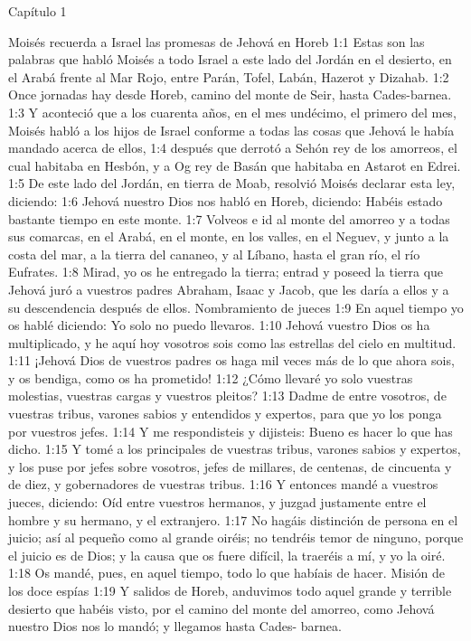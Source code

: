 Capítulo 1


Moisés recuerda a Israel las promesas de Jehová en Horeb  
1:1 Estas son las palabras que habló Moisés a todo Israel a este lado del Jordán en el desierto, en el Arabá frente al Mar Rojo, entre Parán, Tofel, Labán, Hazerot y Dizahab.  
1:2 Once jornadas hay desde Horeb, camino del monte de Seir, hasta Cades-barnea.  
1:3 Y aconteció que a los cuarenta años, en el mes undécimo, el primero del mes, Moisés habló a los hijos de Israel conforme a todas las cosas que Jehová le había mandado acerca de ellos,  
1:4 después que derrotó a Sehón rey de los amorreos, el cual habitaba en Hesbón, y a Og rey de Basán que habitaba en Astarot en Edrei.  
1:5 De este lado del Jordán, en tierra de Moab, resolvió Moisés declarar esta ley, diciendo:  
1:6 Jehová nuestro Dios nos habló en Horeb, diciendo: Habéis estado bastante tiempo en este monte.  
1:7 Volveos e id al monte del amorreo y a todas sus comarcas, en el Arabá, en el monte, en los valles, en el Neguev, y junto a la costa del mar, a la tierra del cananeo, y al Líbano, hasta el gran río, el río Eufrates.  
1:8 Mirad, yo os he entregado la tierra; entrad y poseed la tierra que Jehová juró a vuestros padres Abraham, Isaac y Jacob, que les daría a ellos y a su descendencia después de ellos.  
Nombramiento de jueces   
1:9 En aquel tiempo yo os hablé diciendo: Yo solo no puedo llevaros.  
1:10 Jehová vuestro Dios os ha multiplicado, y he aquí hoy vosotros sois como las estrellas del cielo en multitud.  
1:11 ¡Jehová Dios de vuestros padres os haga mil veces más de lo que ahora sois, y os bendiga, como os ha prometido!  
1:12 ¿Cómo llevaré yo solo vuestras molestias, vuestras cargas y vuestros pleitos?  
1:13 Dadme de entre vosotros, de vuestras tribus, varones sabios y entendidos y expertos, para que yo los ponga por vuestros jefes.  
1:14 Y me respondisteis y dijisteis: Bueno es hacer lo que has dicho.  
1:15 Y tomé a los principales de vuestras tribus, varones sabios y expertos, y los puse por jefes sobre vosotros, jefes de millares, de centenas, de cincuenta y de diez, y gobernadores de vuestras tribus.  
1:16 Y entonces mandé a vuestros jueces, diciendo: Oíd entre vuestros hermanos, y juzgad justamente entre el hombre y su hermano, y el extranjero.  
1:17 No hagáis distinción de persona en el juicio; así al pequeño como al grande oiréis; no tendréis temor de ninguno, porque el juicio es de Dios; y la causa que os fuere difícil, la traeréis a mí, y yo la oiré.  
1:18 Os mandé, pues, en aquel tiempo, todo lo que habíais de hacer.  
Misión de los doce espías   
1:19 Y salidos de Horeb, anduvimos todo aquel grande y terrible desierto que habéis visto, por el camino del monte del amorreo, como Jehová nuestro Dios nos lo mandó; y llegamos hasta Cades- barnea.  
